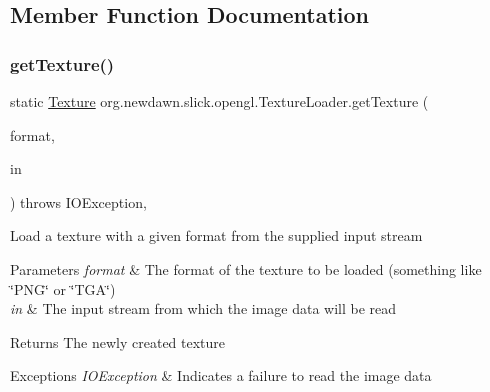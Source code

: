 \subsection{Member Function Documentation}
\mbox{\label{classorg_1_1newdawn_1_1slick_1_1opengl_1_1_texture_loader_a742a83fc3fa1b8c4183e9950c7576adb}} 
\subsubsection{\texorpdfstring{get\+Texture()}{getTexture()}\hspace{0.1cm}{\footnotesize\ttfamily [1/4]}}
{\footnotesize\ttfamily static \mbox{\hyperlink{interfaceorg_1_1newdawn_1_1slick_1_1opengl_1_1_texture}{Texture}} org.\+newdawn.\+slick.\+opengl.\+Texture\+Loader.\+get\+Texture (\begin{DoxyParamCaption}\item[{String}]{format,  }\item[{Input\+Stream}]{in }\end{DoxyParamCaption}) throws I\+O\+Exception\hspace{0.3cm}{\ttfamily [inline]}, {\ttfamily [static]}}

Load a texture with a given format from the supplied input stream


\begin{DoxyParams}{Parameters}
{\em format} & The format of the texture to be loaded (something like \char`\"{}\+P\+N\+G\char`\"{} or \char`\"{}\+T\+G\+A\char`\"{}) \\
\hline
{\em in} & The input stream from which the image data will be read \\
\hline
\end{DoxyParams}
\begin{DoxyReturn}{Returns}
The newly created texture 
\end{DoxyReturn}

\begin{DoxyExceptions}{Exceptions}
{\em I\+O\+Exception} & Indicates a failure to read the image data \\
\hline
\end{DoxyExceptions}

